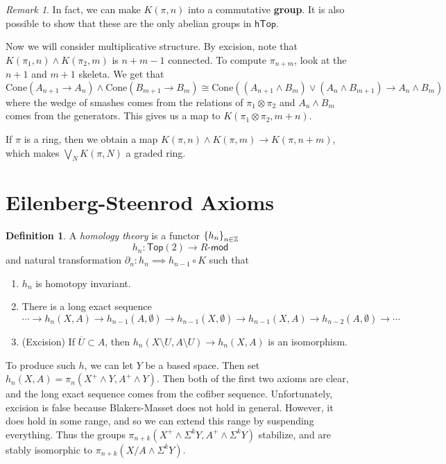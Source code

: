 \documentclass[leqno, openany]{memoir}
\theoremstyle{definition}
\newtheorem{defn}[thm]{Definition}
\theoremstyle{remark}
\newtheorem{rmk}[thm]{Remark}
\theoremstyle{plain}
\theoremstyle{definition}
\theoremstyle{remark}
\newcommand{\Z}{\mathbb{Z}}
\newcommand{\mr}[1]{\mathrm{#1}}
\newcommand{\ms}[1]{\mathsf{#1}}
\newcommand{\ol}[1]{\overline{#1}}
\begin{document}
\begin{rmk}
    In fact, we can make $K(\pi, n)$ into a commutative \textbf{group}. It is also possible to show that these are the only abelian groups in $\ms{hTop}$. 
\end{rmk}

Now we will consider multiplicative structure. By excision, note that $K(\pi_1, n) \wedge K(\pi_2, m)$ is $n+m-1$ connected. To compute $\pi_{n+m}$, look at the $n+1$ and $m+1$ skeleta. We get that
\[\mr{Cone}(A_{n+1} \to A_n) \wedge \mr{Cone}(B_{m+1} \to B_m) \cong \mr{Cone}((A_{n+1} \wedge B_m) \vee (A_n \wedge B_{m+1}) \to A_n \wedge B_m) \]
where the wedge of smashes comes from the relations of $\pi_1 \otimes \pi_2$ and $A_n \wedge B_m$ comes from the generators. This gives us a map to $K(\pi_1 \otimes \pi_2, m+n)$.

If $\pi$ is a ring, then we obtain a map $K(\pi, n) \wedge K(\pi, m) \to K(\pi, n+m)$, which makes $\bigvee_N K(\pi, N)$ a graded ring.

\section{Eilenberg-Steenrod Axioms}%
\label{sec:eilenberg_steenrod_axioms}

\begin{defn}
    A \textit{homology theory} is a functor $\qty{h_n}_{n \in \Z}$ 
    \[ h_n \colon \ms{Top}(2) \to R\text{-}\ms{mod} \]
    and natural transformation $\partial_n \colon h_n \implies h_{n-1} \circ K$ such that
    \begin{enumerate}
        \item $h_n$ is homotopy invariant.
        \item There is a long exact sequence
            \[ \cdots \to h_n(X, A) \to h_{n-1}(A, \emptyset) \to h_{n-1}(X, \emptyset) \to h_{n-1}(X,A) \to h_{n-2}(A, \emptyset) \to \cdots \]
        \item (Excision) If $\ol{U} \subset A$, then $h_n(X \setminus U, A \setminus U) \to h_n(X, A)$ is an isomorphism.
    \end{enumerate}
\end{defn}

To produce such $h$, we can let $Y$ be a based space. Then set $h_n(X, A) = \pi_n(X^+ \wedge Y, A^+ \wedge Y)$. Then both of the first two axioms are clear, and the long exact sequence comes from the cofiber sequence. Unfortunately, excision is false because Blakers-Masset does not hold in general. However, it does hold in some range, and so we can extend this range by suspending everything. Thus the groups $\pi_{n+k} (X^+ \wedge \Sigma^k Y, A^+ \wedge \Sigma^k Y)$ stabilize, and are stably isomorphic to $\pi_{n+k}(X/A \wedge \Sigma^k Y)$.
\end{document}
